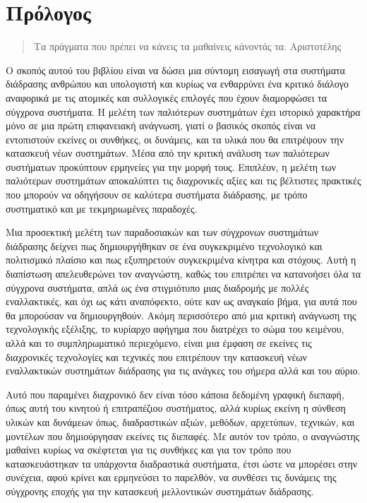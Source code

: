 \documentclass[
]{article}
\author{}
\date{}
\begin{document}
\hypertarget{ux3c0ux3c1ux3ccux3bbux3bfux3b3ux3bfux3c2}{%
\section{Πρόλογος}\label{ux3c0ux3c1ux3ccux3bbux3bfux3b3ux3bfux3c2}}

\begin{quote}
Τα πράγματα που πρέπει να κάνεις τα μαθαίνεις κάνοντάς τα. Αριστοτέλης
\end{quote}

Ο σκοπός αυτού του βιβλίου είναι να δώσει μια σύντομη εισαγωγή στα
συστήματα διάδρασης ανθρώπου και υπολογιστή και κυρίως να ενθαρρύνει ένα
κριτικό διάλογο αναφορικά με τις ατομικές και συλλογικές επιλογές που
έχουν διαμορφώσει τα σύγχρονα συστήματα. Η μελέτη των παλιότερων
συστημάτων έχει ιστορικό χαρακτήρα μόνο σε μια πρώτη επιφανειακή
ανάγνωση, γιατί ο βασικός σκοπός είναι να εντοπιστούν εκείνες οι
συνθήκες, οι δυνάμεις, και τα υλικά που θα επιτρέψουν την κατασκευή νέων
συστημάτων. Μέσα από την κριτική ανάλυση των παλιότερων συστήματων
προκύπτουν ερμηνείες για την μορφή τους. Επιπλέον, η μελέτη των
παλιότερων συστημάτων αποκαλύπτει τις διαχρονικές αξίες και τις
βέλτιστες πρακτικές που μπορούν να οδηγήσουν σε καλύτερα συστήματα
διάδρασης, με τρόπο συστηματικό και με τεκμηριωμένες παραδοχές.

Μια προσεκτική μελέτη των παραδοσιακών και των σύγχρονων συστημάτων
διάδρασης δείχνει πως δημιουργήθηκαν σε ένα συγκεκριμένο τεχνολογικό και
πολιτισμικό πλαίσιο και πως εξυπηρετούν συγκεκριμένα κίνητρα και
στόχους. Αυτή η διαπίστωση απελευθερώνει τον αναγνώστη, καθώς του
επιτρέπει να κατανοήσει όλα τα σύγχρονα συστήματα, απλά ως ένα
στιγμιότυπο μιας διαδρομής με πολλές εναλλακτικές, και όχι ως κάτι
αναπόφεκτο, ούτε καν ως αναγκαίο βήμα, για αυτά που θα μπορούσαν να
δημιουργηθούν. Ακόμη περισσότερο από μια κριτική ανάγνωση της
τεχνολογικής εξέλιξης, το κυρίαρχο αφήγημα που διατρέχει το σώμα του
κειμένου, αλλά και το συμπληρωματικό περιεχόμενο, είναι μια έμφαση σε
εκείνες τις διαχρονικές τεχνολογίες και τεχνικές που επιτρέπουν την
κατασκευή νέων εναλλακτικών συστημάτων διάδρασης για τις ανάγκες του
σήμερα αλλά και του αύριο.

Αυτό που παραμένει διαχρονικό δεν είναι τόσο κάποια δεδομένη γραφική
διεπαφή, όπως αυτή του κινητού ή επιτραπέζιου συστήματος, αλλά κυρίως
εκείνη η σύνθεση υλικών και δυνάμεων όπως, διαδραστικών αξιών, μεθόδων,
αρχετύπων, τεχνικών, και μοντέλων που δημιούργησαν εκείνες τις διεπαφές.
Με αυτόν τον τρόπο, ο αναγνώστης μαθαίνει κυρίως να σκέφτεται για τις
συνθήκες και για τον τρόπο που κατασκευάστηκαν τα υπάρχοντα διαδραστικά
συστήματα, έτσι ώστε να μπορέσει στην συνέχεια, αφού κρίνει και
ερμηνεύσει το παρελθόν, να συνθέσει τις δυνάμεις της σύγχρονης εποχής
για την κατασκευή μελλοντικών συστημάτων διάδρασης.
\end{document}
